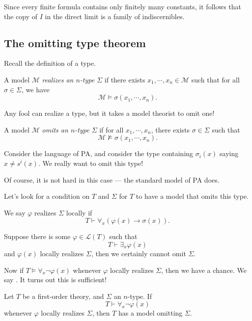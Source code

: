 \documentclass[a4paper]{article}
\begin{document}
Since every finite formula contains only finitely many constants, it follows that the copy of $I$ in the direct limit is a family of indiscernibles.

\subsection{The omitting type theorem}
Recall the definition of a type.
\begin{defi}
  A model $\mathcal{M}$ \emph{realizes an $n$-type $\Sigma$} if there exists $x_1, \cdots, x_n \in \mathcal{M}$ such that for all $\sigma \in \Sigma$, we have
  \[
    \mathcal{M} \vDash \sigma(x_1, \cdots, x_n).
  \]
\end{defi}
Any fool can realize a type, but it takes a model theorist to omit one!

\begin{defi}
  A model $\mathcal{M}$ \emph{omits an $n$-type $\Sigma$} if for all $x_1, \cdots, x_n$, there exists $\sigma \in \Sigma$ such that
  \[
    \mathcal{M} \not\vDash \sigma(x_1, \cdots, x_n).
  \]
\end{defi}

\begin{eg}
  Consider the language of PA, and consider the type containing $\sigma_i(x)$ saying $x \not= s^i(x)$. We really want to omit this type!

  Of course, it is not hard in this case --- the standard model of PA does.
\end{eg}

Let's look for a condition on $T$ and $\Sigma$ for $T$ to have a model that omits this type.

\begin{defi}
  We say $\varphi$ realizes $\Sigma$ locally if
  \[
    T \vdash \forall_x(\varphi(x) \to \sigma(x)).
  \]
\end{defi}
Suppose there is some $\varphi \in \mathcal{L}(T)$ such that
\[
  T \vdash \exists_x \varphi(x)
\]
and $\varphi(x)$ locally realizes $\Sigma$, then we certainly cannot omit $\Sigma$.

Now if $T \vDash \forall_x \neg \varphi(x)$ whenever $\varphi$ locally realizes $\Sigma$, then we have a chance. We say . It turns out this is sufficient!

\begin{thm}
  Let $T$ be a first-order theory, and $\Sigma$ an $n$-type. If
  \[
    T \vdash \forall_x \neg \varphi(x)
  \]
  whenever $\varphi$ locally realizes $\Sigma$, then $T$ has a model omitting $\Sigma$.
\end{thm}
\end{document}
